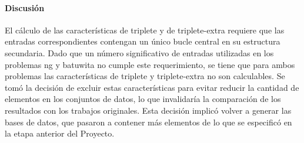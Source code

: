 \documentclass[12pt,bibliography=oldstyle,DIV=12,parskip=half-,titlepage]{scrartcl}
\begin{document}
\paragraph{Discusión}
El cálculo de las características de triplete y de triplete-extra
requiere que las entradas correspondientes contengan un único bucle
central en su estructura secundaria. Dado que un número significativo
de entradas utilizadas en los problemas {ng} y {batuwita} no
cumple este requerimiento, se tiene que para ambos problemas las
características de triplete y triplete-extra no son calculables.
Se tomó la decisión de excluir estas características para
evitar reducir la cantidad de elementos en los conjuntos de datos, lo
que invalidaría la comparación de los resultados con los trabajos
originales. Esta decisión implicó volver a generar las bases de datos,
que pasaron a contener más elementos de lo que se especificó en la
etapa anterior del Proyecto.
\end{document}
